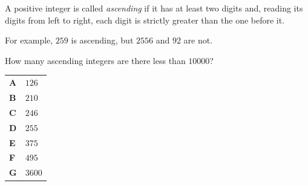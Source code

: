 \documentclass[11pt,a4paper]{article}
\begin{document}
\begin{enumerate}[label=\textbf{\arabic*.},leftmargin=*,itemsep=0pt,start=15]
A positive integer is called \emph{ascending} if it has at least two digits and, reading its digits from left to right, each digit is strictly greater than the one before it. 

For example, $259$ is ascending, but $2556$ and $92$ are not.

How many ascending integers are there less than $10000$?

\par\vspace*{12pt}
\begin{tabularx}{\linewidth}{@{}>{\bfseries}l Y@{}}
A &
$126$
\\[0.8em]
B &
$210$
\\[0.8em]
C &
$246$
\\[0.8em]
D &
$255$
\\[0.8em]
E &
$375$
\\[0.8em]
F &
$495$
\\[0.8em]
G &
$3600$
\\
\end{tabularx}
\end{enumerate}
\clearpage
\thispagestyle{djspaper}
\vspace*{8pt}
\end{document}
